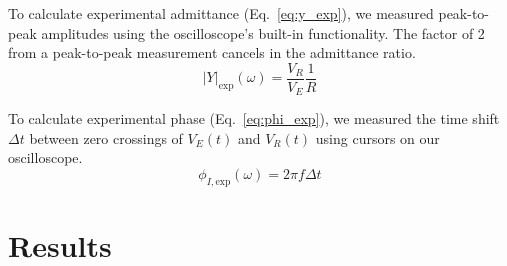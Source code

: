 \documentclass[11pt,twocolumn]{article}
\begin{document}
To calculate experimental admittance (Eq.~\eqref{eq:y_exp}), we measured peak-to-peak amplitudes using the oscilloscope's built-in functionality. The factor of 2 from a peak-to-peak measurement cancels in the admittance ratio.
\begin{equation}
  \label{eq:y_exp}
  |Y|_{\mathrm{exp}}(\omega) = \frac{V_R}{V_E} \frac{1}{R}
\end{equation}

To calculate experimental phase (Eq.~\eqref{eq:phi_exp}), we measured the time shift $\Delta t$ between zero crossings of $V_E(t)$ and $V_R(t)$ using cursors on our oscilloscope.
\begin{equation}
  \label{eq:phi_exp}
  \phi_{I,\mathrm{exp}}(\omega) = 2\pi f \Delta t
\end{equation}

\section{Results}\label{sec:results}
\end{document}
